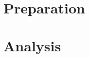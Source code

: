 \documentclass{article}
\begin{document}


\section{Preparation}


%

%

\section{Analysis}


\end{document}
